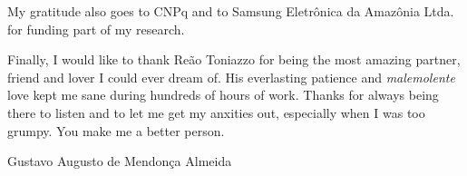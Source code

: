 \begin{acknowledgements}
\bigskip
My gratitude also goes to CNPq and to Samsung Eletr\^onica da Amaz\^onia Ltda. for funding part of my research.

\bigskip
Finally, I would like to thank Re\~ao Toniazzo for being the most amazing partner, friend and lover I could ever dream of. His everlasting patience and \emph{malemolente} love kept me sane during hundreds of hours of work. Thanks for always being there to listen and to let me get my anxities out, especially when I was too grumpy. You make me a better person. 

\vfill
Gustavo Augusto de Mendon\c{c}a Almeida
\end{acknowledgements}
